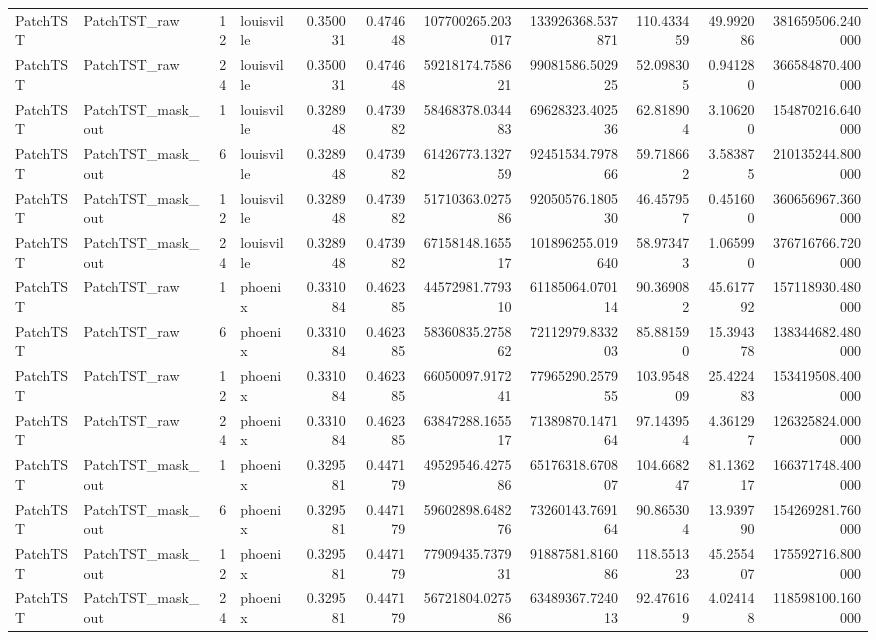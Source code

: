 \begin{longtable}{llrlrrrrrrr}
PatchTST & PatchTST\_raw & 12 & louisville & 0.350031 & 0.474648 & 107700265.203017 & 133926368.537871 & 110.433459 & 49.992086 & 381659506.240000 \\
PatchTST & PatchTST\_raw & 24 & louisville & 0.350031 & 0.474648 & 59218174.758621 & 99081586.502925 & 52.098305 & 0.941280 & 366584870.400000 \\
PatchTST & PatchTST\_mask\_out & 1 & louisville & 0.328948 & 0.473982 & 58468378.034483 & 69628323.402536 & 62.818904 & 3.106200 & 154870216.640000 \\
PatchTST & PatchTST\_mask\_out & 6 & louisville & 0.328948 & 0.473982 & 61426773.132759 & 92451534.797866 & 59.718662 & 3.583875 & 210135244.800000 \\
PatchTST & PatchTST\_mask\_out & 12 & louisville & 0.328948 & 0.473982 & 51710363.027586 & 92050576.180530 & 46.457957 & 0.451600 & 360656967.360000 \\
PatchTST & PatchTST\_mask\_out & 24 & louisville & 0.328948 & 0.473982 & 67158148.165517 & 101896255.019640 & 58.973473 & 1.065990 & 376716766.720000 \\
PatchTST & PatchTST\_raw & 1 & phoenix & 0.331084 & 0.462385 & 44572981.779310 & 61185064.070114 & 90.369082 & 45.617792 & 157118930.480000 \\
PatchTST & PatchTST\_raw & 6 & phoenix & 0.331084 & 0.462385 & 58360835.275862 & 72112979.833203 & 85.881590 & 15.394378 & 138344682.480000 \\
PatchTST & PatchTST\_raw & 12 & phoenix & 0.331084 & 0.462385 & 66050097.917241 & 77965290.257955 & 103.954809 & 25.422483 & 153419508.400000 \\
PatchTST & PatchTST\_raw & 24 & phoenix & 0.331084 & 0.462385 & 63847288.165517 & 71389870.147164 & 97.143954 & 4.361297 & 126325824.000000 \\
PatchTST & PatchTST\_mask\_out & 1 & phoenix & 0.329581 & 0.447179 & 49529546.427586 & 65176318.670807 & 104.668247 & 81.136217 & 166371748.400000 \\
PatchTST & PatchTST\_mask\_out & 6 & phoenix & 0.329581 & 0.447179 & 59602898.648276 & 73260143.769164 & 90.865304 & 13.939790 & 154269281.760000 \\
PatchTST & PatchTST\_mask\_out & 12 & phoenix & 0.329581 & 0.447179 & 77909435.737931 & 91887581.816086 & 118.551323 & 45.255407 & 175592716.800000 \\
PatchTST & PatchTST\_mask\_out & 24 & phoenix & 0.329581 & 0.447179 & 56721804.027586 & 63489367.724013 & 92.476169 & 4.024148 & 118598100.160000 \\

\end{longtable}
